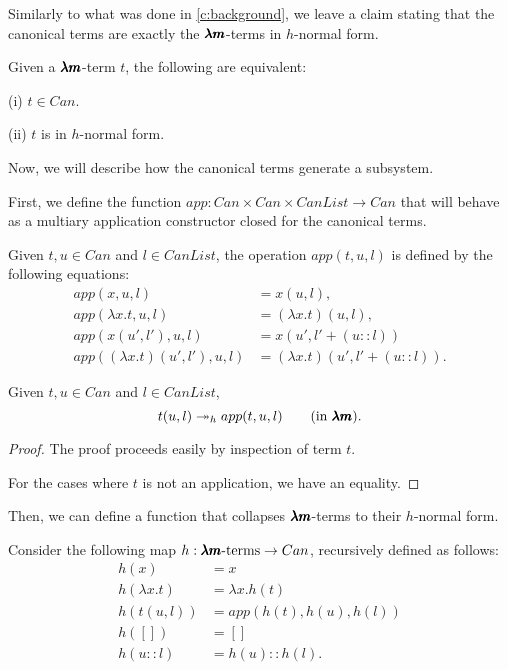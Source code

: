 Similarly to what was done in \cref{c:background}, we leave a claim stating that the canonical terms are exactly the $\pmb{\lambda m}$-terms in $h$-normal form.

\begin{claim}
  Given a $\pmb{\lambda m}$-term $t$, the following are equivalent:

  (i) $t \in Can$.

  (ii) $t$ is in $h$-normal form.
\end{claim}

Now, we will describe how the canonical terms generate a subsystem.

First, we define the function $app : Can \times Can \times CanList \to Can$ that will behave as a multiary application constructor closed for the canonical terms.

\begin{definition}
  Given $t, u \in Can$ and $l \in CanList$, the operation $app(t, u, l)$ is defined by the following equations:
  \begin{align*}
    app(x, u, l)                      &= x(u, l), \\
    app(\lambda x. t, u, l)           &= (\lambda x. t)(u, l), \\ 
    app(x(u', l'), u, l)              &= x(u', l' + (u::l)) \\
    app((\lambda x. t)(u', l'), u, l) &= (\lambda x. t)(u', l'+(u::l)).
  \end{align*}  
\end{definition}

\begin{lemma}
  \label{app_is_multistep}
  Given $t, u \in Can$ and $l \in CanList$, 
  \[ t(u, l) \twoheadrightarrow_h app(t, u, l) \qquad \text{(in $\pmb{\lambda m}$)}. \]
\end{lemma}
\begin{proof}
  The proof proceeds easily by inspection of term $t$.

  For the cases where $t$ is not an application, we have an equality.
\end{proof}

Then, we can define a function that collapses $\pmb{\lambda m}$-terms to their $h$-normal form.

\begin{definition}
  Consider the following map $h : \pmb{\lambda m} \text{-terms} \to Can$, recursively defined as follows:
  \begin{align*}
    h(x)            &= x \\
    h(\lambda x. t) &= \lambda x . h(t) \\
    h(t(u,l))       &= app(h(t), h(u), h(l)) \\
    h([])           &= [] \\
    h(u::l)         &= h(u)::h(l).
  \end{align*}
\end{definition}

